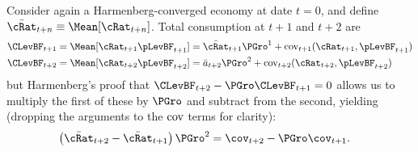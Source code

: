 \documentclass[ProjectDLO]{subfiles}
\begin{document}
Consider again a Harmenberg-converged economy at date $t=0$, and define $\bar{\cRat}_{t+n} \equiv \Mean[\cRat_{t+n}]$.  
Total consumption at $t+1$ and $t+2$ are
\begin{align}
  \CLevBF_{t+1} & = \Mean[\cRat_{t+1}\pLevBF_{t+1}] = \bar{\cRat}_{t+1}\PGro^{1} + \cv_{t+1}(\cRat_{t+1}, \pLevBF_{t+1}) \notag
\\  \CLevBF_{t+2} & = \Mean[\cRat_{t+2}\pLevBF_{t+2}] = \bar{a}_{t+2}\PGro^{2} + \cv_{t+2}(\cRat_{t+2}, \pLevBF_{t+2}) \label{eq:atp2vsatp1}
\end{align}
but Harmenberg's proof that $\CLevBF_{t+2}-\PGro \CLevBF_{t+1}=0$ allows us to multiply the first of these by $\PGro$ and subtract from the second, yielding (dropping the arguments to the $\textup{cov}$ terms for clarity):
\begin{align*}
 \left(\bar{\cRat}_{t+2} - \bar{\cRat}_{t+1}\right)\PGro^{2} & = \cov_{t+2}  - \PGro \cov_{t+1}. \label{eq:MeanaRatVsCovGro2}%
\end{align*}
\end{document}
